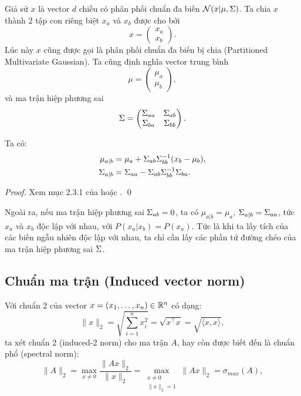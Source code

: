 Giả sử $x$ là vector $d$ chiều có phân phối chuẩn đa biến $\mathcal{N}(x|\mu, \Sigma)$. Ta chia $x$ thành $2$ tập con riêng biệt $x_a$ và $x_b$ được cho bởi \[
x = \begin{pmatrix}
    x_a \\
    x_b
\end{pmatrix}.
\]
Lúc này $x$ cũng được gọi là phân phối chuẩn đa biến bị chia  (Partitioned Multivariate Gaussian).
Ta cũng định nghĩa vector trung bình 
\[
\mu = \begin{pmatrix}
    \mu_a \\
    \mu_b
\end{pmatrix},
\]
và ma trận hiệp phương sai 
\[
\Sigma = \begin{pmatrix}
    \Sigma_{aa} & \Sigma_{ab} \\
    \Sigma_{ba} & \Sigma_{bb} \\
\end{pmatrix}.
\]

Ta có: 
\[
    \begin{split}
        \mu_{a|b} &= \mu_a + \Sigma_{ab}\Sigma_{bb}^{-1} (x_b - \mu_b), \\ 
        \Sigma_{a|b} &= \Sigma_{aa} - \Sigma_{ab} \Sigma_{bb}^{-1} \Sigma_{ba}.
    \end{split}
\]

\begin{proof}
    Xem mục 2.3.1 của \cite{bishop2006pattern} hoặc \cite{statexconditionalgaussian}. \qed
\end{proof}

Ngoài ra, nếu ma trận hiệp phương sai $\Sigma_{ab} = 0$, ta có $\mu_{a|b} = \mu_a$, $\Sigma_{a|b} = \Sigma_{aa}$, tức $x_a$ và $x_b$ độc lập với nhau, với $P(x_a|x_b) = P(x_a)$. Tức là khi ta lấy tích của các biến ngẫu nhiên độc lập với nhau, ta chỉ cần lấy các phần tử đường chéo của ma trận hiệp phương sai $\Sigma$.


\subsection{Chuẩn ma trận (Induced vector norm)}
Với chuẩn $2$ của vector $x = (x_1, \dots, x_n) \in \mathbb R^n$ có dạng:
\[
    \|x\|_2 = \sqrt{ \sum_{i=1}^n x_{i}^2}
    = \sqrt{x^{\top} x}
    = \sqrt{\langle x, x \rangle},
\] ta xét chuẩn 2 (induced-2 norm) cho ma trận $A$, hay còn được biết đến là chuẩn phổ (spectral norm):
\[
    \|A\|_2 = \max_{x \neq 0} {\frac{\|Ax\|_2}{\|x\|_2}}
    = \max_{\substack{x \neq 0 \\ \|x\|_2 = 1}} {\|Ax\|_2} = 
    \sigma_{max} (A),
\]


